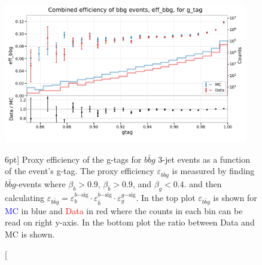 \documentclass[a4paper, twoside, nobib]{tufte-book}
\begin{document}
\begin{figure}
  \includegraphics[width=0.95\textwidth, trim=0 0 0 40, clip]{figures/quarks/eff_bbg_gtag-down_sample=1.00-ML_vars=vertex-selection=b-ejet_min=4-n_iter_RS_lgb=99-n_iter_RS_xgb=9-cdot_cut=0.90-version=19.pdf}
  \caption[g-Tagging proxy efficiency for $b\bar{b}g$-events as function of g-tag][6pt]
          {Proxy efficiency of the g-tags for $b\bar{b}g$ 3-jet events as a function of the event's g-tag. The proxy efficiency $\varepsilon_{b\bar{b}g}$ is measured by finding $b\bar{b}g$-events where $\beta_b > 0.9$, $\beta_{\bar{b}}>0.9$, and $\beta_g < 0.4$. and then calculating  $\varepsilon_{b\bar{b}g} = \varepsilon_b^{b\mathrm{-sig}} \cdot \varepsilon_{\bar{b}}^{b\mathrm{-sig}} \cdot  \varepsilon_g^{g\mathrm{-sig}} $. In the top plot $\varepsilon_{b\bar{b}g}$ is shown for \textcolor{blue}{MC} in blue and \textcolor{red}{Data} in red where the counts in each bin can be read on right y-axis. In the bottom plot the ratio between Data and MC is shown.
          } 
  \label{fig:q:effiency_btag_bbg_gtag}
\end{figure}
\end{document}
